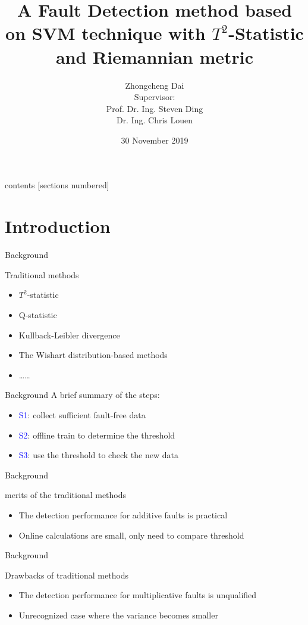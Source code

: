 \documentclass[10pt]{beamer}
\title{A Fault Detection method based on SVM technique with $T^2$-Statistic and Riemannian metric}
\author{Zhongcheng Dai  \\
 Supervisor: \\
 Prof. Dr. Ing. Steven Ding\\
Dr. Ing. Chris Louen 
}
\date{30 November 2019}
\institute{Automatic Control and Complex Systems}
\begin{document}
\maketitle
\begin{frame}{contents}
  [sections numbered]
  \tableofcontents[hideallsubsections]
\end{frame}
\section{Introduction}
\begin{frame}{Background}
    \begin{exampleblock}{Traditional methods}
	\begin{itemize}
    \item $T^2$-statistic
    \item Q-statistic
    \item Kullback-Leibler divergence
    \item The Wishart distribution-based methods
    \item \dots \dots
    \end{itemize}
    \end{exampleblock}
\end{frame}
\begin{frame}{Background}
 A brief summary of the steps:
      \begin{itemize}
      \item \textcolor{blue}{S1}: collect sufficient fault-free data
      \item \textcolor{blue}{S2}: offline train to determine the threshold
      \item \textcolor{blue}{S3}: use the threshold to check the new data
 	 \end{itemize}  
\end{frame}
\begin{frame}{Background}
 \begin{exampleblock}{merits of the traditional methods}
	\begin{itemize}
    \item The detection performance for additive faults is practical
    \item Online calculations are small, only need to compare threshold
    \end{itemize}
    \end{exampleblock}
\end{frame}
\begin{frame}{Background}
\begin{exampleblock}{Drawbacks of traditional methods}
      \begin{itemize}
      \item The detection performance for multiplicative faults is unqualified
      \item Unrecognized case where the variance becomes smaller
 	 \end{itemize}  
 	 \end{exampleblock}
\end{frame}
\end{document}
